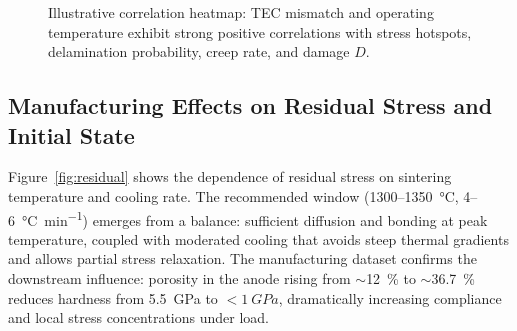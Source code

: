\documentclass[conference]{IEEEtran}
\begin{document}
\begin{figure}[t]
  \centering
  \caption{Illustrative correlation heatmap: TEC mismatch and operating temperature exhibit strong positive correlations with stress hotspots, delamination probability, creep rate, and damage $D$.}
  \label{fig:correlation}
  \vspace{-0.5em}
\end{figure}

\subsection{Manufacturing Effects on Residual Stress and Initial State}
Figure~\ref{fig:residual} shows the dependence of residual stress on sintering temperature and cooling rate. The recommended window (\SI{1300}{}–\SI{1350}{\celsius}, \SI{4}{}–\SI{6}{\celsius\per\minute}) emerges from a balance: sufficient diffusion and bonding at peak temperature, coupled with moderated cooling that avoids steep thermal gradients and allows partial stress relaxation. The manufacturing dataset confirms the downstream influence: porosity in the anode rising from \(\sim\)\SI{12}{\percent} to \(\sim\)\SI{36.7}{\percent} reduces hardness from \SI{5.5}{GPa} to $<\SI{1}{GPa}$, dramatically increasing compliance and local stress concentrations under load.
\end{document}
